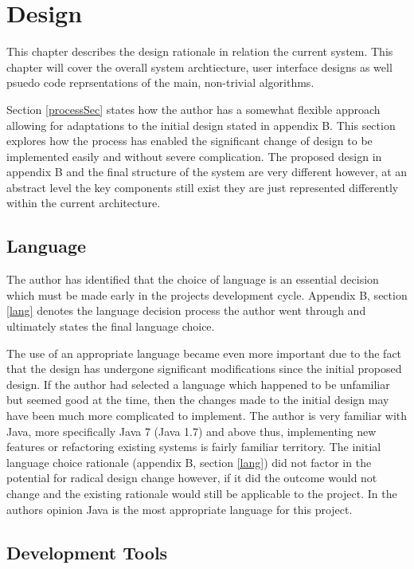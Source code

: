 \chapter{Design}

This chapter describes the design rationale in relation the current system. This chapter will cover the overall system archtiecture, user interface designs as well psuedo code reprsentations of the main, non-trivial algorithms.

\label{DesignSec}
Section \ref{processSec} states how the author has a somewhat flexible approach allowing for adaptations to the initial design stated in appendix B. This section explores how the process has enabled the significant change of design to be implemented easily and without severe complication. The proposed design in appendix B and the final structure of the system are very different however, at an abstract level the key components still exist they are just represented differently within the current architecture. 

\section{Language}

The author has identified that the choice of language is an essential decision which must be made early in the projects development cycle. Appendix B, section \ref{lang} denotes the language decision process the author went through and ultimately states the final language choice.

The use of an appropriate language became even more important due to the fact that the design has undergone significant modifications since the initial proposed design. If the author had selected a language which happened to be unfamiliar but seemed good at the time, then the changes made to the initial design may have been much more complicated to implement. The author is very familiar with Java, more specifically Java 7 (Java 1.7) and above thus, implementing new features or refactoring existing systems is fairly familiar territory. The initial language choice rationale (appendix B, section \ref{lang}) did not factor in the potential for radical design change however, if it did the outcome would not change and the existing rationale would still be applicable to the project. In the authors opinion Java is the most appropriate language for this project.

\section{Development Tools}
